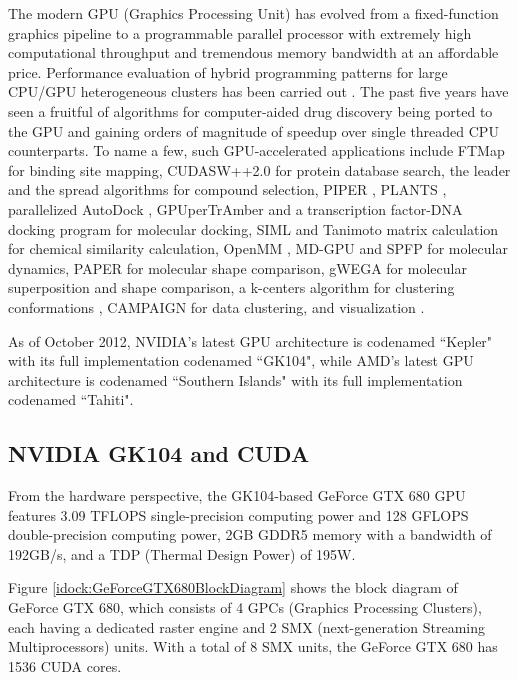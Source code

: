 The modern GPU (Graphics Processing Unit) has evolved from a fixed-function graphics pipeline to a programmable parallel processor with extremely high computational throughput and tremendous memory bandwidth at an affordable price. Performance evaluation of hybrid programming patterns for large CPU/GPU heterogeneous clusters has been carried out \citep{1035}. The past five years have seen a fruitful of algorithms for computer-aided drug discovery being ported to the GPU and gaining orders of magnitude of speedup over single threaded CPU counterparts. To name a few, such GPU-accelerated applications include FTMap \citep{722} for binding site mapping, CUDASW++2.0 \citep{189} for protein database search, the leader and the spread algorithms \citep{750} for compound selection, PIPER \citep{723}, PLANTS \citep{779}, parallelized AutoDock \citep{696}, GPUperTrAmber \citep{1270} and a transcription factor-DNA docking program \citep{1267,1266} for molecular docking, SIML \citep{726} and Tanimoto matrix calculation \citep{881} for chemical similarity calculation, OpenMM \citep{373}, MD-GPU \citep{374} and SPFP \citep{1261} for molecular dynamics, PAPER \citep{491} for molecular shape comparison, gWEGA \citep{1388} for molecular superposition and shape comparison, a k-centers algorithm for clustering conformations \citep{1275}, CAMPAIGN \citep{932} for data clustering, and visualization \citep{986}.

As of October 2012, NVIDIA’s latest GPU architecture is codenamed ``Kepler" with its full implementation codenamed ``GK104", while AMD's latest GPU architecture is codenamed ``Southern Islands" with its full implementation codenamed ``Tahiti".

\subsection{NVIDIA GK104 and CUDA}

From the hardware perspective, the GK104-based GeForce GTX 680 GPU features 3.09 TFLOPS single-precision computing power and 128 GFLOPS double-precision computing power, 2GB GDDR5 memory with a bandwidth of 192GB/s, and a TDP (Thermal Design Power) of 195W.

Figure \ref{idock:GeForceGTX680BlockDiagram} shows the block diagram of GeForce GTX 680, which consists of 4 GPCs (Graphics Processing Clusters), each having a dedicated raster engine and 2 SMX (next-generation Streaming Multiprocessors) units. With a total of 8 SMX units, the GeForce GTX 680 has 1536 CUDA cores.

